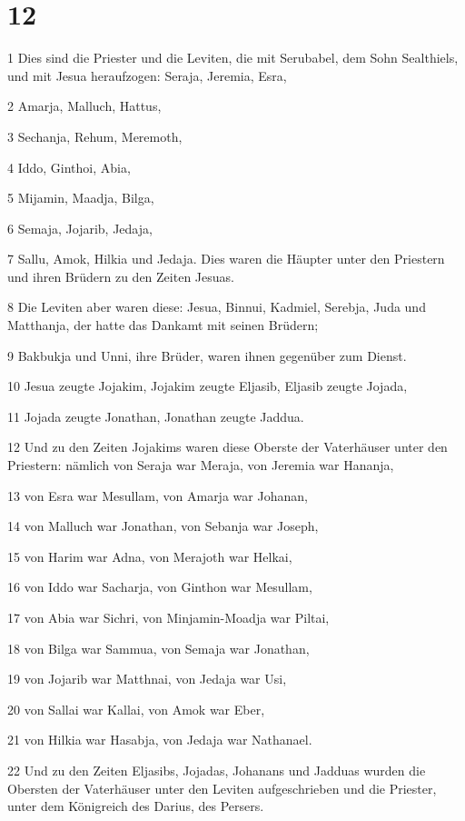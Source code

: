 \chapter{12}

\par 1 Dies sind die Priester und die Leviten, die mit Serubabel, dem Sohn Sealthiels, und mit Jesua heraufzogen: Seraja, Jeremia, Esra,
\par 2 Amarja, Malluch, Hattus,
\par 3 Sechanja, Rehum, Meremoth,
\par 4 Iddo, Ginthoi, Abia,
\par 5 Mijamin, Maadja, Bilga,
\par 6 Semaja, Jojarib, Jedaja,
\par 7 Sallu, Amok, Hilkia und Jedaja. Dies waren die Häupter unter den Priestern und ihren Brüdern zu den Zeiten Jesuas.
\par 8 Die Leviten aber waren diese: Jesua, Binnui, Kadmiel, Serebja, Juda und Matthanja, der hatte das Dankamt mit seinen Brüdern;
\par 9 Bakbukja und Unni, ihre Brüder, waren ihnen gegenüber zum Dienst.
\par 10 Jesua zeugte Jojakim, Jojakim zeugte Eljasib, Eljasib zeugte Jojada,
\par 11 Jojada zeugte Jonathan, Jonathan zeugte Jaddua.
\par 12 Und zu den Zeiten Jojakims waren diese Oberste der Vaterhäuser unter den Priestern: nämlich von Seraja war Meraja, von Jeremia war Hananja,
\par 13 von Esra war Mesullam, von Amarja war Johanan,
\par 14 von Malluch war Jonathan, von Sebanja war Joseph,
\par 15 von Harim war Adna, von Merajoth war Helkai,
\par 16 von Iddo war Sacharja, von Ginthon war Mesullam,
\par 17 von Abia war Sichri, von Minjamin-Moadja war Piltai,
\par 18 von Bilga war Sammua, von Semaja war Jonathan,
\par 19 von Jojarib war Matthnai, von Jedaja war Usi,
\par 20 von Sallai war Kallai, von Amok war Eber,
\par 21 von Hilkia war Hasabja, von Jedaja war Nathanael.
\par 22 Und zu den Zeiten Eljasibs, Jojadas, Johanans und Jadduas wurden die Obersten der Vaterhäuser unter den Leviten aufgeschrieben und die Priester, unter dem Königreich des Darius, des Persers.
